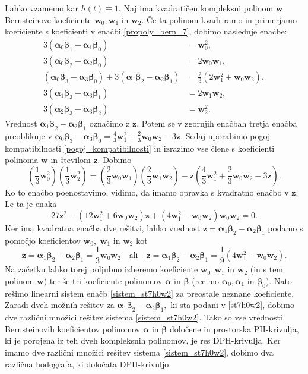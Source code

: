 \documentclass[12pt,a4paper,twoside]{article}
\theoremstyle{definition} %
\theoremstyle{plain} %
\theoremstyle{primerstyle}
\numberwithin{equation}{section}  %
\newcommand{\wV}{\mathbf{w}}
\newcommand{\zV}{\mathbf{z}}
\newcommand{\balpha}{\boldsymbol \alpha}
\newcommand{\bbeta}{\boldsymbol \beta}
\begin{document}
Lahko vzamemo kar $h(t)\equiv1.$ Naj ima kvadratičen kompleksni polinom $\wV$ Bernsteinove koeficiente $\wV_0,\wV_1$ in $\wV_2.$ Če ta polinom kvadriramo in primerjamo koeficiente s koeficienti v enačbi \eqref{propoly_bern_7}, dobimo naslednje enačbe:
\begin{align}
	3(\balpha_0\bbeta_1-\balpha_1\bbeta_0)&=\wV_0^2,\nonumber\\
	3(\balpha_0\bbeta_2-\balpha_2\bbeta_0)&=2\wV_0\wV_1,\nonumber\\
	(\balpha_0\bbeta_3-\balpha_3\bbeta_0)+3(\balpha_1\bbeta_2-\balpha_2\bbeta_1)&=\frac{2}{3}(2\wV_1^2+\wV_0\wV_2),\label{sistem_st7h0w2}\\
	3(\balpha_1\bbeta_3-\balpha_3\bbeta_1)&=2\wV_1\wV_2,\nonumber\\
	3(\balpha_2\bbeta_3-\balpha_3\bbeta_2)&=\wV_2^2.\nonumber
\end{align}
Vrednost $\balpha_1\bbeta_2-\balpha_2\bbeta_1$ označimo z $\zV.$ Potem se v zgornjih enačbah tretja enačba preoblikuje v $\balpha_0\bbeta_3-\balpha_3\bbeta_0=\frac{4}{3}\wV_1^2+\frac{2}{3}\wV_0\wV_2-3\zV.$ Sedaj uporabimo pogoj kompatibilnosti \eqref{pogoj_kompatibilnosti} in izrazimo vse člene s koeficienti polinoma $\wV$ in številom $\zV.$ Dobimo
\begin{equation*}
	\left(\frac{1}{3}\wV_0^2\right)\left(\frac{1}{3}\wV_2^2\right)=\left(\frac{2}{3}\wV_0\wV_1\right)\left(\frac{2}{3}\wV_1\wV_2\right)-\zV\left(\frac{4}{3}\wV_1^2+\frac{2}{3}\wV_0\wV_2-3\zV\right)\!.
\end{equation*}
Ko to enačbo poenostavimo, vidimo, da imamo opravka s kvadratno enačbo v $\zV.$ Le-ta je enaka
\begin{equation*}
	27\zV^2-(12\wV_1^2+6\wV_0\wV_2)\zV+(4\wV_1^2-\wV_0\wV_2)\wV_0\wV_2=0.
\end{equation*}
Ker ima kvadratna enačba dve rešitvi, lahko vrednost $\zV=\balpha_1\bbeta_2-\balpha_2\bbeta_1$ podamo s pomočjo koeficientov $\wV_0,$ $\wV_1$ in $\wV_2$ kot
\begin{equation}
	\label{st7h0w2}
	\zV=\balpha_1\bbeta_2-\balpha_2\bbeta_1=\frac{1}{3}\wV_0\wV_2\quad\text{ali}\quad\zV=\balpha_1\bbeta_2-\balpha_2\bbeta_1=\frac{1}{9}(4\wV_1^2-\wV_0\wV_2).
\end{equation}
Na začetku lahko torej poljubno izberemo koeficiente $\wV_0,\wV_1$ in $\wV_2$ (in s tem polinom $\wV$) ter še tri koeficiente polinomov $\balpha$ in $\bbeta$ (recimo $\balpha_0,\balpha_1$ in $\bbeta_0$). Nato rešimo linearni sistem enačb \eqref{sistem_st7h0w2} za preostale neznane koeficiente. Zaradi dveh možnih rešitev za $\balpha_1\bbeta_2-\balpha_2\bbeta_1,$ ki sta podani v \eqref{st7h0w2}, dobimo dve različni množici rešitev sistema \eqref{sistem_st7h0w2}. Tako so vse vrednosti Bernsteinovih koeficientov polinomov $\balpha$ in $\bbeta$ določene in prostorska PH-krivulja, ki je porojena iz teh dveh kompleksnih polinomov, je res DPH-krivulja. Ker imamo dve različni množici rešitev sistema \eqref{sistem_st7h0w2}, dobimo dva različna hodografa, ki določata DPH-krivuljo.
\end{document}
